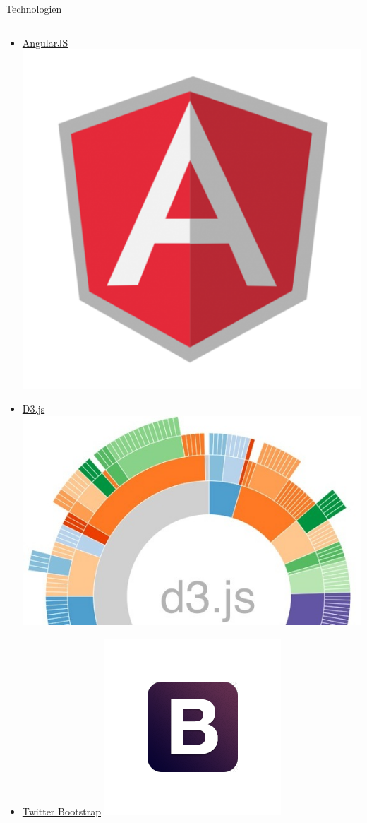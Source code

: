 \documentclass[ucs,9pt]{beamer}
\begin{document}
\begin{frame}{Technologien}
\begin{columns}[c]
\begin{column}[T]{0.49\textwidth}
\begin{itemize}
				\item \href{http://angularjs.org/}{AngularJS} \includegraphics[scale=0.05]{angularjslogo.png}
				\item \href{http://d3js.org/}{D3.js} \includegraphics[scale=0.06]{d3jslogo.jpg}
				\item \href{http://getbootstrap.com/}{Twitter Bootstrap} \includegraphics[scale=0.08]{bootstraplogo.png}

\end{itemize}
\end{column}
\end{columns}
\end{frame}
\end{document}
